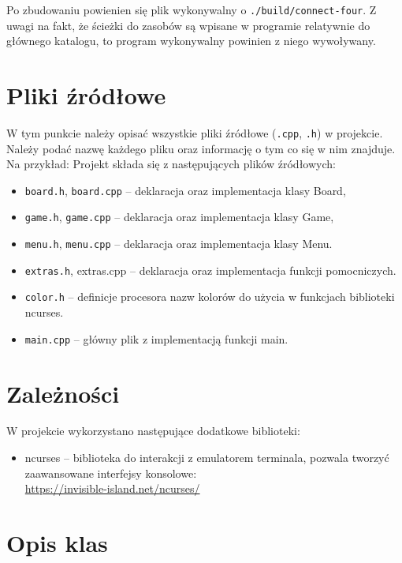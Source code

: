 \documentclass{article}
\begin{document}
Po zbudowaniu powienien się plik wykonywalny o \texttt{./build/connect-four}.
Z uwagi na fakt, że ścieżki do zasobów są wpisane w programie relatywnie 
do głównego katalogu, to program wykonywalny powinien z niego wywoływany.

\section{Pliki źródłowe}

W tym punkcie należy opisać wszystkie pliki źródłowe (\texttt{.cpp}, \texttt{.h}) w projekcie. Należy podać nazwę każdego pliku oraz informację o tym co się w nim znajduje. Na przykład:
Projekt składa się z następujących plików źródłowych:
    \begin{itemize}
    \item \texttt{board.h}, \texttt{board.cpp} – deklaracja oraz implementacja klasy Board,
    \item \texttt{game.h}, \texttt{game.cpp} – deklaracja oraz implementacja klasy Game,
    \item \texttt{menu.h}, \texttt{menu.cpp} – deklaracja oraz implementacja klasy Menu.
    \item \texttt{extras.h}, extras.cpp – deklaracja oraz implementacja funkcji pomocniczych.
    \item \texttt{color.h} – definicje procesora nazw kolorów do użycia w funkcjach biblioteki ncurses.
    \item \texttt{main.cpp} – główny plik z implementacją funkcji main.
    \end{itemize}

\section{Zależności}

W projekcie wykorzystano następujące dodatkowe biblioteki:
    \begin{itemize}
    \item ncurses – biblioteka do interakcji z emulatorem terminala,  
    pozwala  tworzyć zaawansowane interfejsy konsolowe:\\
    \url{https://invisible-island.net/ncurses/}
    \end{itemize}
\section{Opis klas}
\end{document}
